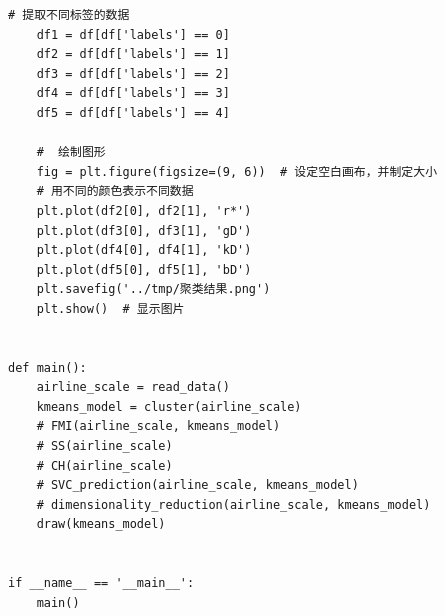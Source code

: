 \documentclass[UTF8,12pt]{article}
\begin{document}
\begin{lstlisting}[title=DataAnalysis\.py,frame=shadowbox]
    # 提取不同标签的数据
    df1 = df[df['labels'] == 0]
    df2 = df[df['labels'] == 1]
    df3 = df[df['labels'] == 2]
    df4 = df[df['labels'] == 3]
    df5 = df[df['labels'] == 4]

    #  绘制图形
    fig = plt.figure(figsize=(9, 6))  # 设定空白画布，并制定大小
    # 用不同的颜色表示不同数据
    plt.plot(df2[0], df2[1], 'r*')
    plt.plot(df3[0], df3[1], 'gD')
    plt.plot(df4[0], df4[1], 'kD')
    plt.plot(df5[0], df5[1], 'bD')
    plt.savefig('../tmp/聚类结果.png')
    plt.show()  # 显示图片


def main():
    airline_scale = read_data()
    kmeans_model = cluster(airline_scale)
    # FMI(airline_scale, kmeans_model)
    # SS(airline_scale)
    # CH(airline_scale)
    # SVC_prediction(airline_scale, kmeans_model)
    # dimensionality_reduction(airline_scale, kmeans_model)
    draw(kmeans_model)


if __name__ == '__main__':
    main()

\end{lstlisting}
\end{document}
